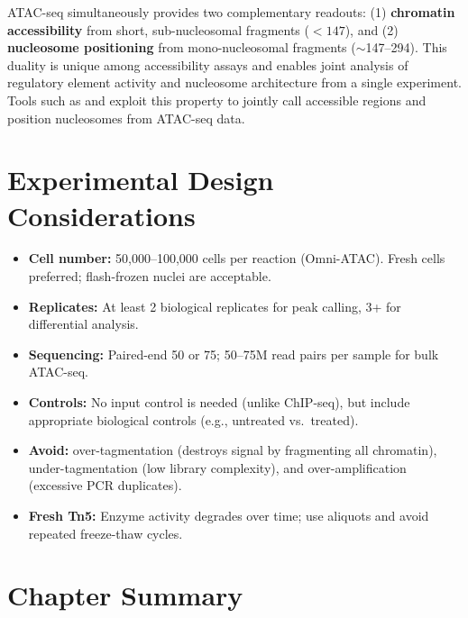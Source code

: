 \begin{keyconcept}[title={ATAC-seq as a Dual Assay}]
ATAC-seq simultaneously provides two complementary readouts: (1) \textbf{chromatin accessibility} from short, sub-nucleosomal fragments ($< 147$\basepair{}), and (2) \textbf{nucleosome positioning} from mono-nucleosomal fragments ($\sim$147--294\basepair{}). This duality is unique among accessibility assays and enables joint analysis of regulatory element activity and nucleosome architecture from a single experiment. Tools such as  and  exploit this property to jointly call accessible regions and position nucleosomes from ATAC-seq data.
\end{keyconcept}

\section{Experimental Design Considerations}
\label{sec:chromatin:design}

\begin{keyconcept}[title={ATAC-seq Experimental Design Checklist}]
\begin{itemize}[itemsep=2pt]
  \item \textbf{Cell number:} 50,000--100,000 cells per reaction (Omni-ATAC). Fresh cells preferred; flash-frozen nuclei are acceptable.
  \item \textbf{Replicates:} At least 2 biological replicates for peak calling, 3+ for differential analysis.
  \item \textbf{Sequencing:} Paired-end 50 or 75\basepair{}; 50--75M read pairs per sample for bulk ATAC-seq.
  \item \textbf{Controls:} No input control is needed (unlike ChIP-seq), but include appropriate biological controls (e.g., untreated vs.\ treated).
  \item \textbf{Avoid:} over-tagmentation (destroys signal by fragmenting all chromatin), under-tagmentation (low library complexity), and over-amplification (excessive PCR duplicates).
  \item \textbf{Fresh Tn5:} Enzyme activity degrades over time; use aliquots and avoid repeated freeze-thaw cycles.
\end{itemize}
\end{keyconcept}

\section{Chapter Summary}
\label{sec:chromatin:summary}

